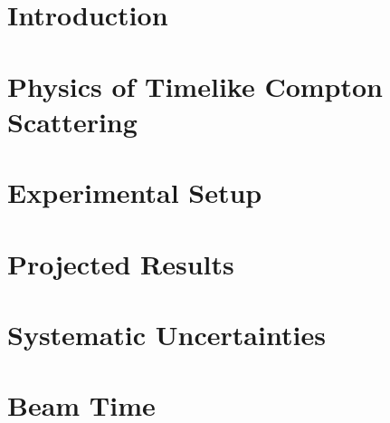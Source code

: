 \documentclass[letterpaper,superscriptaddress,amsmath,amssymb,aps,11pt]{revtex4}
\begin{document}
\maketitle
\clearpage

\tableofcontents

\newpage
\section{Introduction}
\label{sec:intro}


\newpage
\section{Physics of Timelike Compton Scattering}
\label{sec:phm}


\newpage
\section{Experimental Setup}
\label{sec:exp}


\newpage
\section{Projected Results}
\label{sec:rates}


\newpage
\section{Systematic Uncertainties}
\label{sec:systematics}


\newpage
\section{Beam Time}
\label{sec:beamtime}

 
\clearpage
%

%

\end{document}
